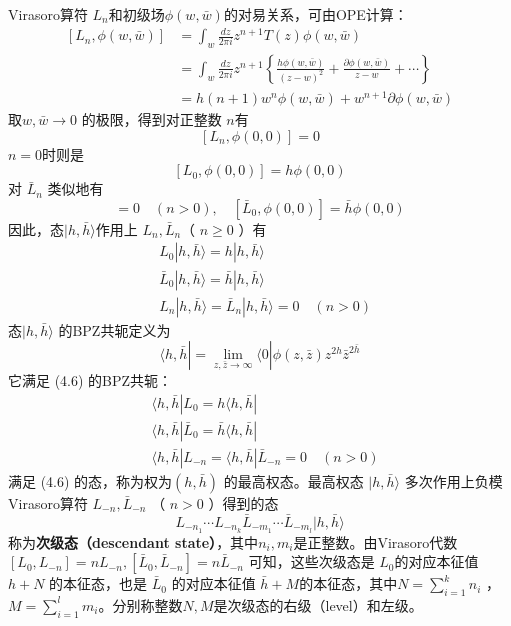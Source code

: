 Virasoro算符 $L_n $和初级场$ \phi(w,\bar{w}) $的对易关系，可由OPE计算：
\begin{equation}
	\begin{aligned} \left[L_{n}, \phi(w, \bar{w})\right] &=\int_{w} \frac{d z}{2 \pi i} z^{n+1} T(z) \phi(w, \bar{w}) \\ &=\int_{w} \frac{d z}{2 \pi i} z^{n+1}\left\{\frac{h \phi(w, \bar{w})}{(z-w)^{2}}+\frac{\partial \phi(w, \bar{w})}{z-w}+\cdots\right\} \\ &=h(n+1) w^{n} \phi(w, \bar{w})+w^{n+1} \partial \phi(w, \bar{w}) \end{aligned}
\end{equation}
取$ w,\bar{w}\to 0$ 的极限，得到对正整数 $n $有
\begin{equation}
	\left[L_{n}, \phi(0,0)\right]=0
\end{equation}
$n=0 $时则是
\begin{equation}
	\left[L_{0}, \phi(0,0)\right]=h \phi(0,0)
\end{equation}
对 $\bar{L}_n$ 类似地有
\begin{equation}
	[\bar{L}_{n}, \phi(0,0)]=0 \quad(n>0), \quad [\bar{L}_{0}, \phi(0,0) ]=\bar{h} \phi(0,0)
\end{equation}
因此，态$ |h,\bar{h}\rangle $作用上 $L_n,\bar{L}_n $（ $n\geq 0$ ）有
\begin{equation}
	\begin{aligned} &L_{0}|h, \bar{h}\rangle=h|h, \bar{h}\rangle \\ &\bar{L}_{0}|h, \bar{h}\rangle=\bar{h}|h, \bar{h}\rangle \\ &L_{n}|h, \bar{h}\rangle=\bar{L}_{n}|h, \bar{h}\rangle=0 \quad(n>0) \end{aligned}
\end{equation}
态$ |h,\bar{h}\rangle$ 的BPZ共轭定义为
\begin{equation}
\langle h, \bar{h}|=\lim _{z, \bar{z} \rightarrow \infty}\langle 0| \phi(z, \bar{z}) z^{2 h} \bar{z}^{2 \bar{h}}
\end{equation}
它满足 (4.6) 的BPZ共轭：
\begin{equation}
	\begin{aligned} &\langle h, \bar{h}| L_{0}=h\langle h, \bar{h}| \\& \langle h, \bar{h}| \bar{L}_{0}=\bar{h}\langle h, \bar{h}| \\& \langle h, \bar{h}| L_{-n}=\langle h, \bar{h}| \bar{L}_{-n}=0 \quad(n>0) \end{aligned}
\end{equation}
满足 (4.6) 的态，称为权为$ (h,\bar{h})$ 的最高权态。最高权态 $|h,\bar{h}\rangle$ 多次作用上负模Virasoro算符 $L_{-n},\bar{L}_{-n}$ （ $n>0$ ）得到的态
\begin{equation}
L_{-n_{1}} \cdots L_{-n_{k}} \bar{L}_{-m_{1}} \cdots \bar{L}_{-m_{l}}|h, \bar{h}\rangle
\end{equation}
称为\textbf{次级态（descendant state）}，其中$ n_i,m_i $是正整数。由Virasoro代数 $[L_{0}, L_{-n} ]=n L_{-n}, [\bar{L}_{0}, \bar{L}_{-n} ]=n \bar{L}_{-n}$ 可知，这些次级态是 $L_0 $的对应本征值 $h+N$ 的本征态，也是 $\bar{L}_0$ 的对应本征值 $\bar{h}+M $的本征态，其中$ N=\sum_{i=1}^{k} n_{i}$ ， $M=\sum_{i=1}^{l} m_{i} $。分别称整数$ N,M $是次级态的右级（level）和左级。

